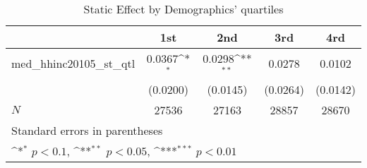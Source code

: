\begin{table}[htbp]\centering
\def\sym#1{\ifmmode^{#1}\else\(^{#1}\)\fi}
\caption{Static Effect by Demographics' quartiles}
\begin{tabular}{l*{4}{c}}
\hline\hline
            &\multicolumn{1}{c}{1st}&\multicolumn{1}{c}{2nd}&\multicolumn{1}{c}{3rd}&\multicolumn{1}{c}{4rd}\\
\hline
med\_hhinc20105\_st\_qtl&      0.0367\sym{*}  &      0.0298\sym{**} &      0.0278         &      0.0102         \\
            &    (0.0200)         &    (0.0145)         &    (0.0264)         &    (0.0142)         \\
\hline
\(N\)       &       27536         &       27163         &       28857         &       28670         \\
\hline\hline
\multicolumn{5}{l}{\footnotesize Standard errors in parentheses}\\
\multicolumn{5}{l}{\footnotesize \sym{*} \(p<0.1\), \sym{**} \(p<0.05\), \sym{***} \(p<0.01\)}\\
\end{tabular}
\end{table}

